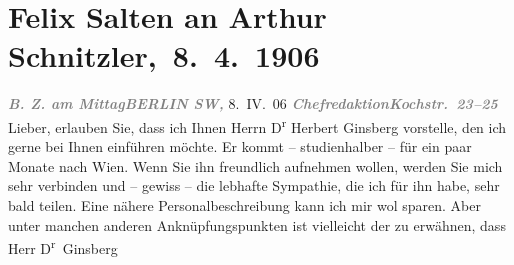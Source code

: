

         
         \renewcommand{\erwaehntePersonen}{Personen: Herbert Ginsberg, Felix Salten, Ottilie Salten, Olga Schnitzler}
         \renewcommand{\erwaehnteInstitutionen}{Institutionen: B.Z. am Mittag}
         \renewcommand{\erwaehnteOrte}{Orte: Berlin, Griechenland, Kairo, Kochstraße, Wien}
         \renewcommand{\erwaehnteWerke}{Werke: Reisen der Jahre 1893–1909}
               \section[ Felix Salten an Arthur Schnitzler, 8. 4. 1906]{ Felix Salten an Arthur Schnitzler, 8. 4. 1906}\nopagebreak{}\rehead{ }\begin{ledgroupsized}[t]{13cm}\normalsize\beginnumbering{} \toendnotes[C]{\smallbreak\pagebreak[2]} 
\toendnotes[C]{\smallbreak}\pstart
           \noindent{}{\pb}\textcolor{gray}{\textbf{\emph{B. Z. am Mittag}}}\hfill \textcolor{gray}{\textbf{\emph{BERLIN SW,}}}{ }8. IV. 06\pend
           \pstart
           \textcolor{gray}{\textbf{\emph{Chefredaktion}}}\hfill \textcolor{gray}{\textbf{\emph{Kochstr. 23–25}}}\pend
           \pstart
           Lieber, erlauben Sie, dass ich Ihnen Herrn D\textsuperscript{r}{ }Herbert Ginsberg vorstelle, den ich gerne bei
               Ihnen einführen möchte. Er kommt – studienhalber – für ein paar Monate nach Wien. Wenn Sie ihn freundlich aufnehmen wollen,
               werden Sie mich sehr verbinden und – gewiss – die lebhafte Sympathie, die ich für ihn
               habe, sehr bald teilen. Eine nähere Personalbeschreibung kann ich mir wol sparen.
               Aber unter manchen anderen Anknüpfungspunkten ist vielleicht der zu erwähnen, dass
               Herr D\textsuperscript{r} Ginsberg

\end{ledgroupsized}
